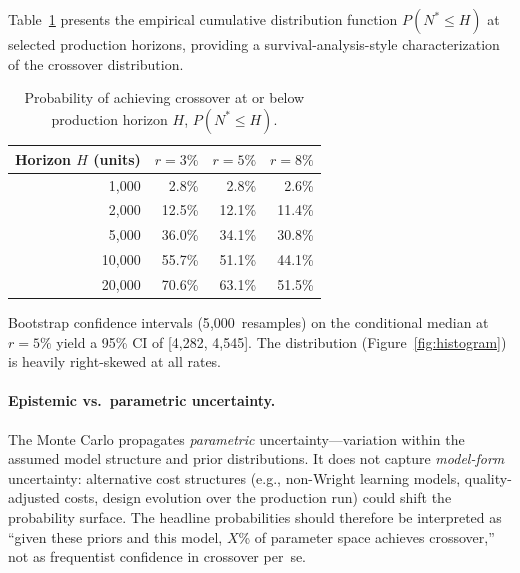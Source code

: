 \documentclass[preprint,12pt]{elsarticle}
\begin{document}
Table~\ref{tab:convergence} presents the empirical cumulative distribution function $P(N^* \leq H)$ at selected production horizons, providing a survival-analysis-style characterization of the crossover distribution.

\begin{table}[htbp]
\centering
\caption{Probability of achieving crossover at or below production horizon $H$, $P(N^* \leq H)$.}
\label{tab:convergence}
\small
\begin{tabular}{@{}rrrr@{}}
\toprule
Horizon $H$ (units) & $r = 3\%$ & $r = 5\%$ & $r = 8\%$ \\
\midrule
1{,}000  & 2.8\% & 2.8\% & 2.6\% \\
2{,}000  & 12.5\% & 12.1\% & 11.4\% \\
5{,}000  & 36.0\% & 34.1\% & 30.8\% \\
10{,}000 & 55.7\% & 51.1\% & 44.1\% \\
20{,}000 & 70.6\% & 63.1\% & 51.5\% \\
\bottomrule
\end{tabular}
\end{table}

Bootstrap confidence intervals (5{,}000~resamples) on the conditional median at $r = 5\%$ yield a 95\% CI of [4{,}282, 4{,}545]. The distribution (Figure~\ref{fig:histogram}) is heavily right-skewed at all rates.

\paragraph{Epistemic vs.\ parametric uncertainty.} The Monte Carlo propagates \emph{parametric} uncertainty---variation within the assumed model structure and prior distributions. It does not capture \emph{model-form} uncertainty: alternative cost structures (e.g., non-Wright learning models, quality-adjusted costs, design evolution over the production run) could shift the probability surface. The headline probabilities should therefore be interpreted as ``given these priors and this model, $X$\% of parameter space achieves crossover,'' not as frequentist confidence in crossover per~se.
\end{document}
